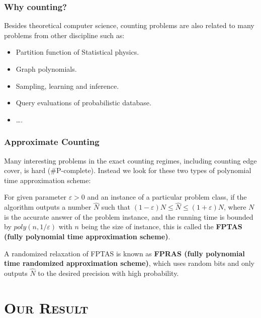 \documentclass[mathserif]{beamer}
\newcommand{\eps}{\varepsilon}
\begin{document}
\begin{frame}
	\frametitle{Why counting?}
Besides theoretical computer science, counting problems are also related to many problems from other discipline such as:
\begin{itemize}
	\item Partition function of Statistical physics.
		\pause
	\item Graph polynomials.
		\pause
	\item Sampling, learning and inference.
		\pause
	\item Query evaluations of probabilistic database.
	\item \dots.
\end{itemize}
\end{frame}

\begin{frame}
	\frametitle{Approximate Counting}
	Many interesting problems in the exact counting regimes, including counting edge cover, is hard (\#P-complete).
	Instead we look for these two types of polynomial time approximation scheme:
	\pause
	\begin{definition}[FPTAS]
		For given parameter $\eps > 0$ and an instance of a particular problem class, if the algorithm outputs a number $\hat{N}$ such that $(1-\eps) N \leq \hat{N} \leq (1+\eps) N$, where $N$ is the accurate answer of the problem instance, and the running time is bounded by $poly(n, 1/ \eps)$ with $n$ being the size of instance, this is called the {\bf FPTAS (fully polynomial time approximation scheme)}.

	\end{definition}
	\pause
	\begin{definition}[FPRAS]
		A randomized relaxation of FPTAS is known as {\bf FPRAS (fully polynomial time randomized approximation scheme)}, which uses random bits and only outputs $\hat{N}$ to the desired precision with high probability.
	\end{definition}
\end{frame}

%	


\section{\scshape Our Result}
\end{document}
